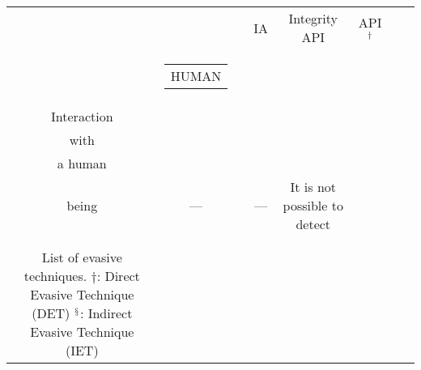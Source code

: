 \begin{landscape}
\begin{scriptsize}
\begin{longtable}{|c|cc|cc|ccc|}
                                                &                                                                                                           &                                                                                                    & IA                          & Integrity API                                                                                                                                           & API$^{\dagger}$          &                                                                                                                                                                                                                                                                            &                                                                                                                    \\ \cline{2-8} 
                                                & \begin{tabular}[c]{@{}c@{}}HUMAN\end{tabular}                   & \begin{tabular}[c]{@{}c@{}}\\Interaction \\ with \\ a human \\ being\end{tabular}                    & ---                         &                                                                                                                                                         & ---                      & It is not possible to detect                                                                                                                                                                                                                                               &                                                                                                                    \\

                                                \\ \\ \bottomrule

\caption{List of evasive techniques. \\
  $\dagger$: Direct Evasive Technique (DET) \\
  $^{\mathsection}$: Indirect Evasive Technique (IET)
}
\label{tab:all_evasive}

\end{longtable}
\end{scriptsize}
\end{landscape}